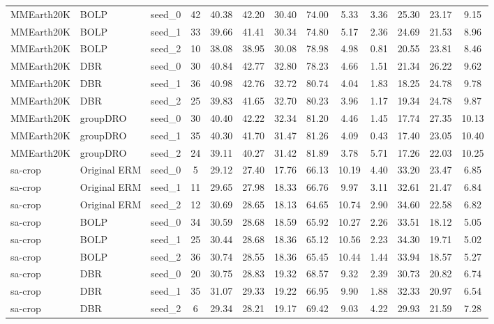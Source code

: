 \documentclass[11pt]{article}
\begin{document}
\begin{table}[h!]
{\begin{tabular}{lllcccccccccc}
MMEarth20K & BOLP & seed\_0 & 42 & 40.38 & 42.20 & 30.40 & 74.00 & 5.33 & 3.36 & 25.30 & 23.17 & 9.15 \\
MMEarth20K & BOLP & seed\_1 & 33 & 39.66 & 41.41 & 30.34 & 74.80 & 5.17 & 2.36 & 24.69 & 21.53 & 8.96 \\
MMEarth20K & BOLP & seed\_2 & 10 & 38.08 & 38.95 & 30.08 & 78.98 & 4.98 & 0.81 & 20.55 & 23.81 & 8.46 \\

MMEarth20K & DBR & seed\_0 & 30 & 40.84 & 42.77 & 32.80 & 78.23 & 4.66 & 1.51 & 21.34 & 26.22 & 9.62 \\
MMEarth20K & DBR & seed\_1 & 36 & 40.98 & 42.76 & 32.72 & 80.74 & 4.04 & 1.83 & 18.25 & 24.78 & 9.78 \\
MMEarth20K & DBR & seed\_2 & 25 & 39.83 & 41.65 & 32.70 & 80.23 & 3.96 & 1.17 & 19.34 & 24.78 & 9.87 \\

MMEarth20K & groupDRO & seed\_0 & 30 & 40.40 & 42.22 & 32.34 & 81.20 & 4.46 & 1.45 & 17.74 & 27.35 & 10.13 \\
MMEarth20K & groupDRO & seed\_1 & 35 & 40.30 & 41.70 & 31.47 & 81.26 & 4.09 & 0.43 & 17.40 & 23.05 & 10.40 \\
MMEarth20K & groupDRO & seed\_2 & 24 & 39.11 & 40.27 & 31.42 & 81.89 & 3.78 & 5.71 & 17.26 & 22.03 & 10.25 \\

\midrule

sa-crop & Original ERM & seed\_0 & 5 & 29.12 & 27.40 & 17.76 & 66.13 & 10.19 & 4.40 & 33.20 & 23.47 & 6.85 \\
sa-crop & Original ERM & seed\_1 & 11 & 29.65 & 27.98 & 18.33 & 66.76 & 9.97 & 3.11 & 32.61 & 21.47 & 6.84 \\
sa-crop & Original ERM & seed\_2 & 12 & 30.69 & 28.65 & 18.13 & 64.65 & 10.74 & 2.90 & 34.60 & 22.58 & 6.82 \\

sa-crop & BOLP & seed\_0 & 34 & 30.59 & 28.68 & 18.59 & 65.92 & 10.27 & 2.26 & 33.51 & 18.12 & 5.05 \\
sa-crop & BOLP & seed\_1 & 25 & 30.44 & 28.68 & 18.36 & 65.12 & 10.56 & 2.23 & 34.30 & 19.71 & 5.02 \\
sa-crop & BOLP & seed\_2 & 36 & 30.74 & 28.55 & 18.36 & 65.45 & 10.44 & 1.44 & 33.94 & 18.57 & 5.27 \\

sa-crop & DBR & seed\_0 & 20 & 30.75 & 28.83 & 19.32 & 68.57 & 9.32 & 2.39 & 30.73 & 20.82 & 6.74 \\
sa-crop & DBR & seed\_1 & 35 & 31.07 & 29.33 & 19.22 & 66.95 & 9.90 & 1.88 & 32.33 & 20.97 & 6.54 \\
sa-crop & DBR & seed\_2 & 6 & 29.34 & 28.21 & 19.17 & 69.42 & 9.03 & 4.22 & 29.93 & 21.59 & 7.28 \\


\end{tabular}}
\end{table}
\end{document}
